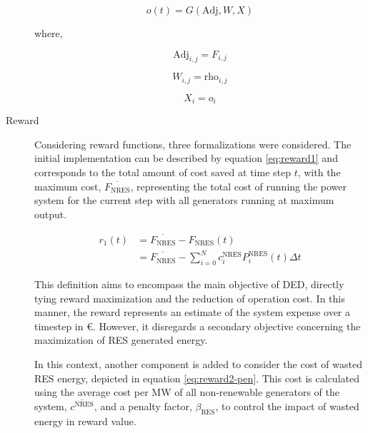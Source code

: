 \begin{description}
	\begin{equation}
		o(t) = G(\text{Adj}, W, X)
	\end{equation}
	
	where,
	
	\begin{equation}
		\text{Adj}_{i,j} = F_{i,j}
	\end{equation}
	
	\begin{equation}
		W_{i,j} = \text{rho}_{i,j}
	\end{equation}
	
	\begin{equation}
		X_i = o_i
	\end{equation}
	

	
	\item[Reward] Considering reward functions, three formalizations were considered. The initial implementation can be described by equation \ref{eq:reward1} and corresponds to the total amount of cost saved at time step $t$, with the maximum cost, $\overline{F_\text{NRES}}$, representing the total cost of running the power system for the current step with all generators running at maximum output. \par
	
	
	\begin{equation} \label{eq:reward1}
		\begin{split}
			r_1(t) &= \overline{F_\text{NRES}} - F_\text{NRES}(t) \\
			&= \overline{F_\text{NRES}} - \sum^N_{i=0} c^\text{NRES}_i P^\text{NRES}_i(t) \Delta t
		\end{split}
	\end{equation}
	
	This definition aims to encompass the main objective of \ac{DED}, directly tying reward maximization and the reduction of operation cost. In this manner, the reward represents an estimate of the system expense over a timestep in €. However, it disregards a secondary objective concerning the maximization of \ac{RES} generated energy. \par
	In this context, another component is added to consider the cost of wasted \ac{RES} energy, depicted in equation \ref{eq:reward2-pen}. This cost is calculated using the average cost per MW of all non-renewable generators of the system, $\overline{c^\text{NRES}}$, and a penalty factor, $\beta_\text{RES}$, to control the impact of wasted energy in reward value. \par
	

\end{description}
